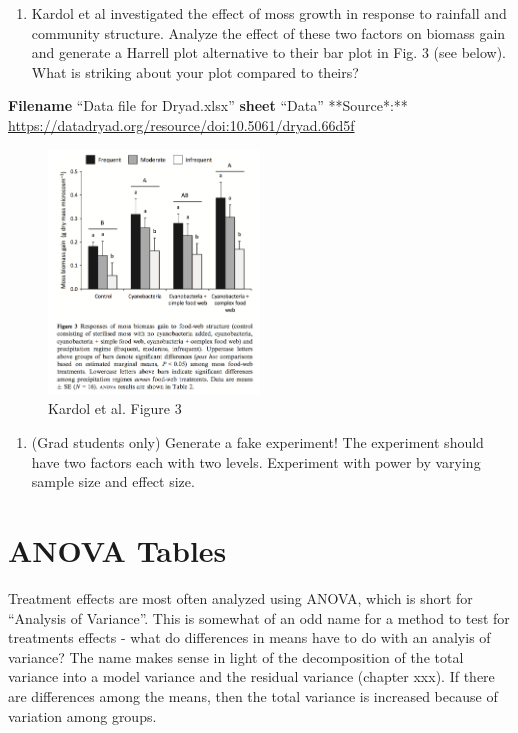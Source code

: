 \documentclass[]{book}
\providecommand{\tightlist}{%
  \setlength{\itemsep}{0pt}\setlength{\parskip}{0pt}}
\begin{document}
\begin{enumerate}
\def\labelenumi{\arabic{enumi}.}
\setcounter{enumi}{2}
\tightlist
\item
  Kardol et al investigated the effect of moss growth in response to
  rainfall and community structure. Analyze the effect of these two
  factors on biomass gain and generate a Harrell plot alternative to
  their bar plot in Fig. 3 (see below). What is striking about your plot
  compared to theirs?
\end{enumerate}

\textbf{Filename} ``Data file for Dryad.xlsx'' \textbf{sheet} ``Data''
**Source*:**
\url{https://datadryad.org/resource/doi:10.5061/dryad.66d5f}

\begin{figure}
\centering
\includegraphics[width=0.50000\textwidth]{images/kardol_fig_3.png}
\caption{Kardol et al. Figure 3}
\end{figure}

\begin{enumerate}
\def\labelenumi{\arabic{enumi}.}
\setcounter{enumi}{3}
\tightlist
\item
  (Grad students only) Generate a fake experiment! The experiment should
  have two factors each with two levels. Experiment with power by
  varying sample size and effect size.
\end{enumerate}

\chapter{ANOVA Tables}\label{anova-tables}

Treatment effects are most often analyzed using ANOVA, which is short
for ``Analysis of Variance''. This is somewhat of an odd name for a
method to test for treatments effects - what do differences in means
have to do with an analyis of variance? The name makes sense in light of
the decomposition of the total variance into a model variance and the
residual variance (chapter xxx). If there are differences among the
means, then the total variance is increased because of variation among
groups.
\end{document}
